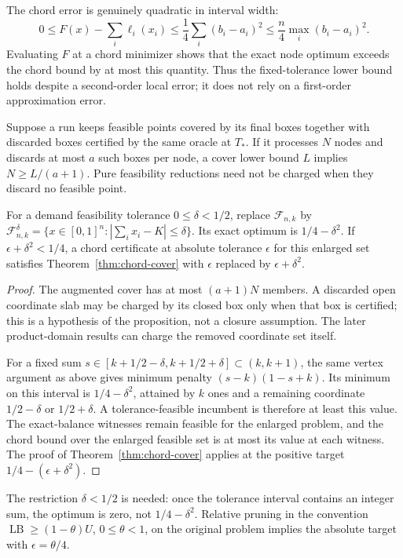 The chord error is genuinely quadratic in interval width:
\begin{equation}\label{eq:second-order-chord}
 0\le F(x)-\sum_i\ell_i(x_i)
 \le\frac14\sum_i(b_i-a_i)^2
 \le\frac n4\max_i(b_i-a_i)^2.
\end{equation}
Evaluating $F$ at a chord minimizer shows that the exact node optimum
exceeds the chord bound by at most this quantity. Thus the fixed-tolerance
lower bound holds despite a second-order local error; it does not rely on
a first-order approximation error.

\begin{proposition}
\label{prop:charged-tolerance}
Suppose a run keeps feasible points covered by its final boxes together
with discarded boxes certified by the same oracle at $T_*$. If it processes
$N$ nodes and discards at most $a$ such boxes per node, a cover lower bound
$L$ implies $N\ge L/(a+1)$. Pure feasibility reductions need not be
charged when they discard no feasible point.

For a demand feasibility tolerance $0\le\delta<1/2$, replace
$\mathcal F_{n,k}$ by
$\mathcal F^\delta_{n,k}=\{x\in[0,1]^n:|\sum_i x_i-K|\le\delta\}$.
Its exact optimum is $1/4-\delta^2$. If
$\epsilon+\delta^2<1/4$, a chord certificate at absolute tolerance
$\epsilon$ for this enlarged set satisfies Theorem~\ref{thm:chord-cover}
with $\epsilon$ replaced by $\epsilon+\delta^2$.
\end{proposition}
\begin{proof}
The augmented cover has at most $(a+1)N$ members. A discarded open
coordinate slab may be charged by its closed box only when that box is
certified; this is a hypothesis of the proposition, not a closure
assumption. The later product-domain results can charge the removed
coordinate set itself.

For a fixed sum $s\in[k+1/2-\delta,k+1/2+\delta]\subset(k,k+1)$,
the same vertex argument as above gives minimum penalty
$(s-k)(1-s+k)$. Its minimum on this interval is
$1/4-\delta^2$, attained by $k$ ones and a remaining coordinate
$1/2-\delta$ or $1/2+\delta$. A tolerance-feasible incumbent is therefore
at least this value. The exact-balance witnesses remain feasible for the
enlarged problem, and the chord bound over the enlarged feasible set is
at most its value at each witness. The proof of
Theorem~\ref{thm:chord-cover} applies at the positive target
$1/4-(\epsilon+\delta^2)$.
\end{proof}
The restriction $\delta<1/2$ is needed: once the tolerance interval
contains an integer sum, the optimum is zero, not $1/4-\delta^2$. Relative pruning in the convention
$\operatorname{LB}\ge(1-\theta)U$, $0\le\theta<1$, on the original
problem implies the absolute target with $\epsilon=\theta/4$.

